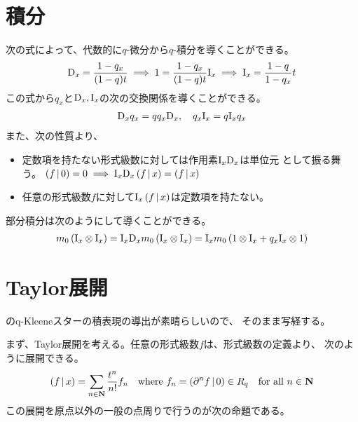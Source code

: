 {\section{積分}\label{s1:積分} %
	次の式によって、代数的に$q$-微分から$q$-積分を導くことができる。
	\begin{equation*}\begin{split}
		\qD_x = \frac{1-q_x}{(1-q)t}
		\implies 1 = \frac{1-q_x}{(1-q)t}\qI_x
		\implies \qI_x = \frac{1-q}{1-q_x}t
	\end{split}\end{equation*}
	この式から$q_x$と$\qD_x,\qI_x$の次の交換関係を導くことができる。
	\begin{equation*}\begin{split}
		\qD_xq_x = qq_x\qD_x,\quad q_x\qI_x = q\qI_xq_x
	\end{split}\end{equation*}
	また、次の性質より、
	\begin{itemize}\setlength{\itemsep}{-1mm} %
		\item 定数項を持たない形式級数に対しては作用素$\qI_x\qD_x$は単位元
		として振る舞う。
		$\plr{f\bou 0} = 0 \implies \qI_x\qD_x\plr{f\bou x} = \plr{f\bou x}$
		\item 任意の形式級数$f$に対して$\qI_x\plr{f\bou x}$は定数項を持たない。
	\end{itemize} %
	部分積分は次のようにして導くことができる。
	\begin{equation*}\begin{split}
		m_0\plr{\qI_x\otimes\qI_x} = \qI_x\qD_xm_0\plr{\qI_x\otimes\qI_x}
		= \qI_xm_0\plr{1\otimes\qI_x + q_x\qI_x\otimes1}
	\end{split}\end{equation*}

\section{Taylor展開}\label{s1:Taylor展開} %
	\cite{kac:2002}のq-Kleeneスターの積表現の導出が素晴らしいので、
	そのまま写経する。

	まず、Taylor展開を考える。任意の形式級数$f$は、形式級数の定義より、
	次のように展開できる。
	\begin{equation*}\begin{split}
		\plr{f\bou x} = \sum_{n\in\sizen}\frac{t^n}{n!} f_n
		\quad\text{where } f_n=\plr{\partial^nf\bou 0}\in R_q 
		\quad\text{for all } n\in\sizen
	\end{split}\end{equation*}
	この展開を原点以外の一般の点周りで行うのが次の命題である。

}
